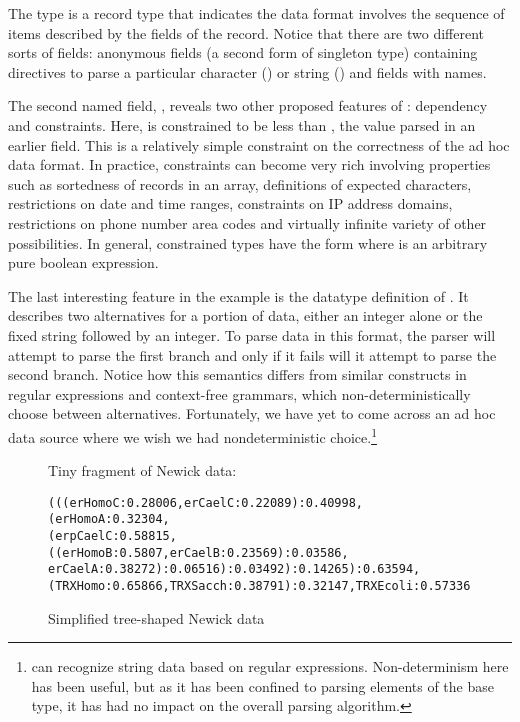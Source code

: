 The type  is a record type that indicates the data
format involves the sequence of items described by the fields of the
record.  Notice that there are two different sorts of fields:
anonymous fields (a second form of singleton type) containing
directives to parse a particular character () or string
() and fields with names.

The second named field, , reveals two other
proposed features of \padsml: dependency and constraints.  Here,
 is constrained to be less than ,
the value parsed in an earlier field.  This is a relatively simple
constraint on the correctness of the ad hoc data format.  In practice,
constraints can become very rich involving properties such as
sortedness of records in an array, definitions of expected characters,
restrictions on date and time ranges, constraints on IP address
domains, restrictions on phone number area codes and virtually
infinite variety of other possibilities. In general, constrained
types have the form \cd{[x:T | e]} where  is an arbitrary pure
boolean expression.  

The last interesting feature in the \dibbler{} example is the datatype
definition of .  It describes two alternatives for a
portion of data, either an integer alone or the fixed string
 followed by an integer.  To parse data in this format,
the parser will attempt to parse the first branch and only if it fails
will it attempt to parse the second branch.  Notice how this semantics
differs from similar constructs in regular expressions and
context-free grammars, which non-deterministically choose between
alternatives.  Fortunately, we have yet to come across an ad hoc data
source where we wish we had nondeterministic choice.\footnote{\pads{}
  can recognize string data based on regular expressions.
  Non-determinism here has been useful, but as it has been confined to
  parsing elements of the  base type, it has had no impact
  on the overall parsing algorithm.}

\begin{figure}

Tiny fragment of Newick data:

{\scriptsize
\begin{verbatim}
(((erHomoC:0.28006,erCaelC:0.22089):0.40998,(erHomoA:0.32304,
(erpCaelC:0.58815,((erHomoB:0.5807,erCaelB:0.23569):0.03586,
erCaelA:0.38272):0.06516):0.03492):0.14265):0.63594,
(TRXHomo:0.65866,TRXSacch:0.38791):0.32147,TRXEcoli:0.57336)
\end{verbatim}
}
  \caption{Simplified tree-shaped Newick data}
  \label{fig:newick}
\end{figure}

